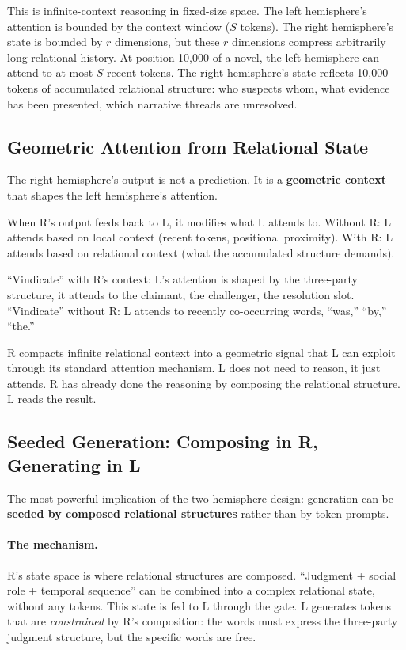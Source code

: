\documentclass[11pt, a4paper]{article}
\theoremstyle{plain}
\theoremstyle{definition}
\theoremstyle{remark}
\begin{document}
This is infinite-context reasoning in fixed-size space.
The left hemisphere's attention is bounded by the context window ($S$ tokens).
The right hemisphere's state is bounded by $r$ dimensions, but these $r$ dimensions compress arbitrarily long relational history.
At position 10,000 of a novel, the left hemisphere can attend to at most $S$ recent tokens.
The right hemisphere's state reflects 10,000 tokens of accumulated relational structure: who suspects whom, what evidence has been presented, which narrative threads are unresolved.

\subsection{Geometric Attention from Relational State}

The right hemisphere's output is not a prediction.
It is a \textbf{geometric context} that shapes the left hemisphere's attention.

When R's output feeds back to L, it modifies what L attends to.
Without R: L attends based on local context (recent tokens, positional proximity).
With R: L attends based on relational context (what the accumulated structure demands).

``Vindicate'' with R's context: L's attention is shaped by the three-party structure, it attends to the claimant, the challenger, the resolution slot.
``Vindicate'' without R: L attends to recently co-occurring words, ``was,'' ``by,'' ``the.''

R compacts infinite relational context into a geometric signal that L can exploit through its standard attention mechanism.
L does not need to reason, it just attends.
R has already done the reasoning by composing the relational structure.
L reads the result.

\subsection{Seeded Generation: Composing in R, Generating in L}

The most powerful implication of the two-hemisphere design: generation can be \textbf{seeded by composed relational structures} rather than by token prompts.

\paragraph{The mechanism.}
R's state space is where relational structures are composed.
``Judgment + social role + temporal sequence'' can be combined into a complex relational state, without any tokens.
This state is fed to L through the gate.
L generates tokens that are \emph{constrained} by R's composition: the words must express the three-party judgment structure, but the specific words are free.
\end{document}
